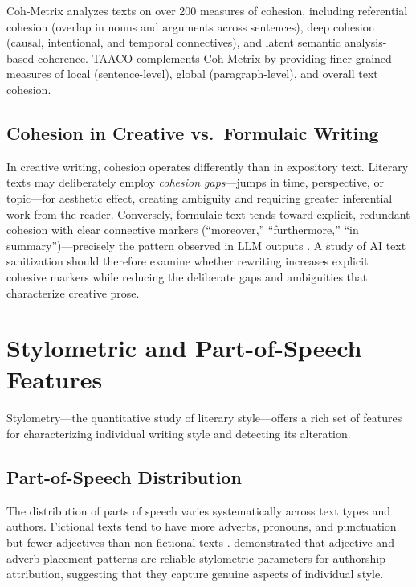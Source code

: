 \documentclass[12pt,a4paper]{article}
\begin{document}
Coh-Metrix \citep{graesser2004cohmetrix, mcnamara2014automated} analyzes texts on over 200 measures of cohesion, including referential cohesion (overlap in nouns and arguments across sentences), deep cohesion (causal, intentional, and temporal connectives), and latent semantic analysis-based coherence. TAACO \citep{crossley2016taaco} complements Coh-Metrix by providing finer-grained measures of local (sentence-level), global (paragraph-level), and overall text cohesion.

\subsection{Cohesion in Creative vs.\ Formulaic Writing}

In creative writing, cohesion operates differently than in expository text. Literary texts may deliberately employ \emph{cohesion gaps}---jumps in time, perspective, or topic---for aesthetic effect, creating ambiguity and requiring greater inferential work from the reader. Conversely, formulaic text tends toward explicit, redundant cohesion with clear connective markers (``moreover,'' ``furthermore,'' ``in summary'')---precisely the pattern observed in LLM outputs \citep{tang2024survey}. A study of AI text sanitization should therefore examine whether rewriting increases explicit cohesive markers while reducing the deliberate gaps and ambiguities that characterize creative prose.

\section{Stylometric and Part-of-Speech Features}

Stylometry---the quantitative study of literary style---offers a rich set of features for characterizing individual writing style and detecting its alteration.

\subsection{Part-of-Speech Distribution}

The distribution of parts of speech varies systematically across text types and authors. Fictional texts tend to have more adverbs, pronouns, and punctuation but fewer adjectives than non-fictional texts \citep{literary_profiling2022, pos_genre2023}. \citet{adj_adv_stylometric2023} demonstrated that adjective and adverb placement patterns are reliable stylometric parameters for authorship attribution, suggesting that they capture genuine aspects of individual style.
\end{document}
